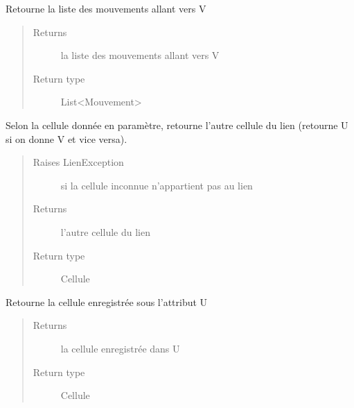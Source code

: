 \documentclass[letterpaper,10pt,english]{sphinxmanual}
\begin{document}
\begin{fulllineitems}
\begin{fulllineitems}
\label{index:Lien.Lien.getMouvementsVersV}
Retourne la liste des mouvements allant vers V
\begin{quote}\begin{description}
\item[{Returns}] \leavevmode
la liste des mouvements allant vers V

\item[{Return type}] \leavevmode
List\textless{}Mouvement\textgreater{}

\end{description}\end{quote}

\end{fulllineitems}


\begin{fulllineitems}
\label{index:Lien.Lien.getOtherCellule}
Selon la cellule donnée en paramètre, retourne l'autre cellule du lien (retourne U si on donne V et vice versa).
\begin{quote}\begin{description}
\item[{Raises LienException}] \leavevmode
si la cellule inconnue n'appartient pas au lien

\item[{Returns}] \leavevmode
l'autre cellule du lien

\item[{Return type}] \leavevmode
Cellule

\end{description}\end{quote}

\end{fulllineitems}


\begin{fulllineitems}
\label{index:Lien.Lien.getU}
Retourne la cellule enregistrée sous l'attribut U
\begin{quote}\begin{description}
\item[{Returns}] \leavevmode
la cellule enregistrée dans U

\item[{Return type}] \leavevmode
Cellule


\end{description}
\end{quote}
\end{fulllineitems}
\end{fulllineitems}
\end{document}
